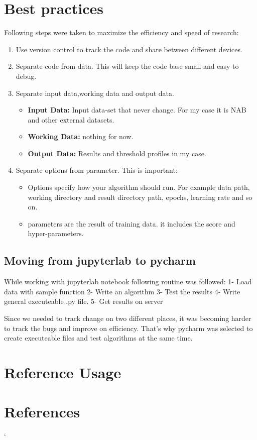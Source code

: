 \documentclass[12pt]{article}
\begin{document}
\section{Best practices}
Following steps were taken to maximize the efficiency and speed of research:
\begin{enumerate}
	\item Use version control to track the code and share between different devices.
	\item Separate code from data. This will keep the code base small and easy to debug.
	\item Separate input data,working data and output data.
	\begin{itemize}
		\item \textbf{Input Data:} Input data-set that never change. For my case it is NAB and other external datasets.
		\item \textbf{Working Data:} nothing for now.
		\item \textbf{Output Data:} Results and threshold profiles in my case. 
	\end{itemize}
	\item Separate options from parameter. This is important:
 	\begin{itemize}
 		\item Options specify how your algorithm should run. For example data path, working directory and result directory path, epochs, learning rate and so on.
 		\item parameters are the result of training data. it includes the score and hyper-parameters. 
 	\end{itemize}
	
\end{enumerate}
\newpage
\subsection{Moving from jupyterlab to pycharm}
While working with jupyterlab notebook following routine was followed:
1- Load data with sample function
2- Write an algorithm
3- Test the results
4- Write general executeable .py file.
5- Get results on server

Since we needed to track change on two different places,
it was becoming harder to track the bugs and improve on efficiency.
That's why pycharm was selected to create executeable files and test
algorithms at the same time.
\section{Reference Usage}
\newpage
\section{References}
\begingroup
\nocite{*}
\renewcommand{\section}[2]{}
`

\endgroup
\end{document}
